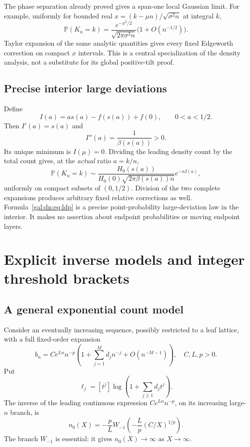 \documentclass[11pt,letterpaper]{article}
\numberwithin{equation}{section}
\theoremstyle{definition}\newtheorem{definition}[theorem]{Definition}
\theoremstyle{remark}\newtheorem{remark}[theorem]{Remark}
\newcommand{\Pp}{\mathbb P}
\begin{document}
The phase separation already proved gives a span-one local Gaussian limit. For example, uniformly for bounded real
$x=(k-\mu n)/\sqrt{\sigma^2n}$ at integral $k$,
\begin{equation}\label{gal:dn:eq:lclt}
 \Pp(K_n=k)=\frac{e^{-x^2/2}}{\sqrt{2\pi\sigma^2n}}
                       \bigl(1+O(n^{-1/2})\bigr).
\end{equation}
Taylor expansion of the same analytic quantities gives every fixed Edgeworth correction on compact $x$ intervals. This is a central specialization of the density analysis, not a substitute for its global positive-tilt proof.

\subsection{Precise interior large deviations}
Define
\begin{equation}\label{gal:dn:eq:rate}
 I(a)=a s(a)-f(s(a))+f(0),\qquad 0<a<1/2.
\end{equation}
Then $I'(a)=s(a)$ and
\[
 I''(a)=\frac1{\beta(s(a))}>0.
\]
Its unique minimum is $I(\mu)=0$. Dividing the leading density count by the total count gives, at the \emph{actual} ratio $a=k/n$,
\begin{equation}\label{gal:dn:eq:ldp}
 \Pp(K_n=k)\sim
 \frac{H_0(s(a))}{H_0(0)\sqrt{2\pi\beta(s(a))n}}
 e^{-nI(a)},
\end{equation}
uniformly on compact subsets of $(0,1/2)$. Division of the two complete expansions produces arbitrary fixed relative corrections as well. Formula~\eqref{gal:dn:eq:ldp} is a precise point-probability large-deviation law in the interior. It makes no assertion about endpoint probabilities or moving endpoint layers.

\section{Explicit inverse models and integer threshold brackets}\label{gal:dn:sec:inversion}
\subsection{A general exponential count model}
Consider an eventually increasing sequence, possibly restricted to a leaf lattice, with a full fixed-order expansion
\begin{equation}\label{gal:dn:eq:bn}
 b_n=C e^{Ln}n^{-p}\left(1+\sum_{j=1}^M d_jn^{-j}+O(n^{-M-1})\right),
 \quad C,L,p>0.
\end{equation}
Put
\[
 \ell_j=[t^j]\log\left(1+\sum_{j\geq1}d_jt^j\right).
\]
The inverse of the leading continuous expression $Ce^{Ln}n^{-p}$, on its increasing large-$n$ branch, is
\begin{equation}\label{gal:dn:eq:W}
 n_0(X)=-\frac pL W_{-1}\!\left(-\frac Lp(C/X)^{1/p}\right).
\end{equation}
The branch $W_{-1}$ is essential: it gives $n_0(X)\to\infty$ as $X\to\infty$.
\end{document}
